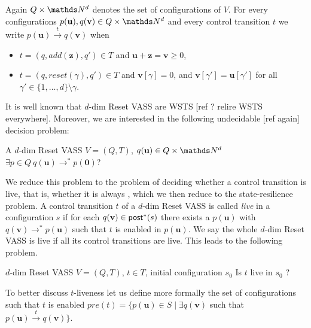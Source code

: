 Again $Q \times \N^d$
 denotes the set of configurations of $V$.
For every configurations $p(\textbf{u}), q(\textbf{v}) \in Q \times \N^d$ and every control transition $t$ we write
$p(\textbf{u}) \xrightarrow{t} q(\textbf{v})$ when 

\begin{itemize}

\item  $t = (q,add(\textbf{z}),q') \in T$
and $\textbf{u}+\textbf{z} = \textbf{v} \geq 0$,

\item $t = (q,reset(\gamma),q') \in T$ 
and
$\textbf{v}[\gamma] = 0$, and $\textbf{v}[\gamma'] = \textbf{u}[\gamma']$ for all $\gamma' \in \{1,\ldots, d\} \setminus \gamma$.
\end{itemize}

It is well known that $d$-dim Reset VASS are WSTS [ref ? relire WSTS everywhere]. 
Moreover, we are interested in the following undecidable [ref again] decision problem:

\begin{samepage}
{A $d$-dim Reset VASS $V=(Q,T)$, $q(\textbf{u}) \in Q \times \N^d$}
{$\exists p \in Q ~ q(\textbf{u}) \to^* p(\textbf{0})$? \\}
\end{samepage}

We reduce this problem to the problem of deciding whether a control transition is live, that is, whether it is always ,
which we then reduce to the state-resilience problem.
A control transition $t$ of a $d$-dim Reset VASS is called {\em live} in a configuration $s$ if for each $q(\textbf{v}) \in \textsf{post}^*(s)$ there exists a 
 $p(\textbf{u})$ with $q(\textbf{v}) \to^* p(\textbf{u})$ such that $t$ is enabled in $p(\textbf{u})$. We say the whole $d$-dim Reset VASS is live if all its control transitions are
live. This leads to the following problem.

{$d$-dim Reset VASS $V=(Q,T)$, $t \in T$, initial configuration $s_0$}
{Is $t$ live in $s_0$ ? \\}


To better discuss $t$-liveness let us define more formally the set of configurations such that $t$ is enabled
$pre(t)=\{ p(\textbf{u}) \in S \mid \exists q(\textbf{v})$ such that $ p(\textbf{u}) \xrightarrow{t} q(\textbf{v}) \}$.

